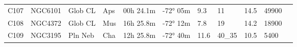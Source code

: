 \begin{table}[h]
\begin{tabular}{@{}lllllllllll@{}}
C107       & NGC6101     & Glob CL    & Aps       & 00h 24.1m & -72° 05m  & 9.3       & 11                   & 14.5     & 49900               &                                 \\
C108       & NGC4372     & Glob CL    & Mus       & 16h 25.8m & -72° 12m  & 7.8       & 19                   & 14.2     & 18900               &                                 \\
C109       & NGC3195     & Pln Neb    & Cha       & 12h 25.8m & -72° 40m  & 11.6      & 40\_35               & 10.5     & 5400                &                                 \\ \bottomrule
\end{tabular}
\end{table}

